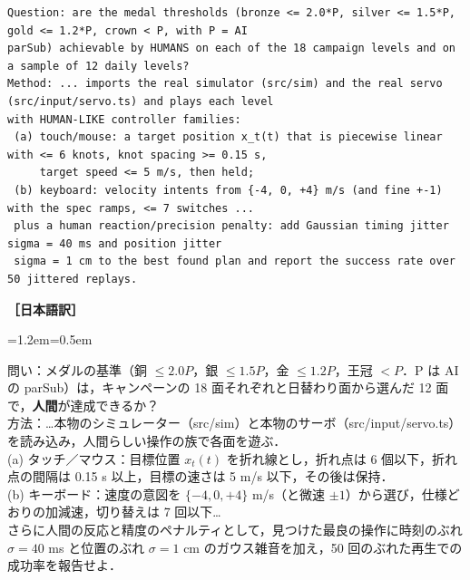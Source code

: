 \documentclass[a4paper,10pt]{ltjsarticle}
\newenvironment{yaku}{\par\vspace{-2pt}\small\noindent\textbf{［日本語訳］}\par\nopagebreak\begin{list}{}{\leftmargin=1.2em\rightmargin=0.5em\topsep=1pt}\item\relax}{\end{list}\vspace{4pt}}
\begin{document}
\begin{lstlisting}[caption={難易度調査役への指示（抜粋）}]
Question: are the medal thresholds (bronze <= 2.0*P, silver <= 1.5*P, gold <= 1.2*P, crown < P, with P = AI
parSub) achievable by HUMANS on each of the 18 campaign levels and on a sample of 12 daily levels?
Method: ... imports the real simulator (src/sim) and the real servo (src/input/servo.ts) and plays each level
with HUMAN-LIKE controller families:
 (a) touch/mouse: a target position x_t(t) that is piecewise linear with <= 6 knots, knot spacing >= 0.15 s,
     target speed <= 5 m/s, then held;
 (b) keyboard: velocity intents from {-4, 0, +4} m/s (and fine +-1) with the spec ramps, <= 7 switches ...
 plus a human reaction/precision penalty: add Gaussian timing jitter sigma = 40 ms and position jitter
 sigma = 1 cm to the best found plan and report the success rate over 50 jittered replays.
\end{lstlisting}
\begin{yaku}
問い：メダルの基準（銅 $\le 2.0P$，銀 $\le 1.5P$，金 $\le 1.2P$，王冠 $< P$．P は AI の parSub）は，キャンペーンの 18 面それぞれと日替わり面から選んだ 12 面で，\textbf{人間}が達成できるか？\\
方法：…本物のシミュレーター（src/sim）と本物のサーボ（src/input/servo.ts）を読み込み，人間らしい操作の族で各面を遊ぶ．\\
(a) タッチ／マウス：目標位置 $x_t(t)$ を折れ線とし，折れ点は 6 個以下，折れ点の間隔は 0.15 s 以上，目標の速さは 5 m/s 以下，その後は保持．\\
(b) キーボード：速度の意図を $\{-4, 0, +4\}$ m/s（と微速 $\pm 1$）から選び，仕様どおりの加減速，切り替えは 7 回以下…\\
さらに人間の反応と精度のペナルティとして，見つけた最良の操作に時刻のぶれ $\sigma = 40$ ms と位置のぶれ $\sigma = 1$ cm のガウス雑音を加え，50 回のぶれた再生での成功率を報告せよ．
\end{yaku}
\end{document}
